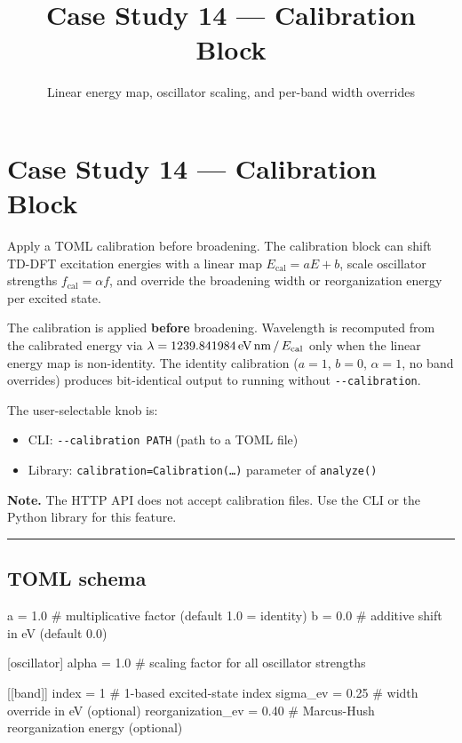 \documentclass[
  11pt,
]{article}
\title{Case Study 14 --- Calibration Block}
\subtitle{Linear energy map, oscillator scaling, and per-band width overrides}
\author{}
\date{}
\newenvironment{Shaded}{}{}
\providecommand{\tightlist}{
  \setlength{\itemsep}{0pt}\setlength{\parskip}{0pt}}
\begin{document}
\maketitle

{
\hypersetup{linkcolor=}
\setcounter{tocdepth}{2}
\tableofcontents
}
\hypertarget{case-study-14--calibration-block}{
\section{Case Study 14 --- Calibration
Block}\label{case-study-14--calibration-block}}

Apply a TOML calibration before broadening. The calibration block can
shift TD-DFT excitation energies with a linear map
\(E_{\text{cal}} = aE + b\), scale oscillator strengths
\(f_{\text{cal}} = \alpha f\), and override the broadening width or
reorganization energy per excited state.

The calibration is applied \textbf{before} broadening. Wavelength is
recomputed from the calibrated energy via
\(\lambda = 1239.841984\,\text{eV\,nm}\,/\,E_{\text{cal}}\) only when
the linear energy map is non-identity. The identity calibration
(\(a=1\), \(b=0\), \(\alpha=1\), no band overrides) produces
bit-identical output to running without \texttt{-{}-calibration}.

The user-selectable knob is:
\begin{itemize}
\tightlist
\item
  CLI: \texttt{-{}-calibration PATH} (path to a TOML file)
\item
  Library: \texttt{calibration=Calibration(\ldots)} parameter of
  \texttt{analyze()}
\end{itemize}

\textbf{Note.} The HTTP API does not accept calibration files. Use the
CLI or the Python library for this feature.

\begin{center}\rule{0.5\linewidth}{0.5pt}\end{center}

\hypertarget{toml-schema}{
\subsection{TOML schema}\label{toml-schema}}

\begin{Shaded}
\begin{Highlighting}[]
[energy]
a = 1.0    # multiplicative factor (default 1.0 = identity)
b = 0.0    # additive shift in eV (default 0.0)

[oscillator]
alpha = 1.0   # scaling factor for all oscillator strengths

[[band]]
index = 1           # 1-based excited-state index
sigma_ev = 0.25     # width override in eV (optional)
reorganization_ev = 0.40  # Marcus-Hush reorganization energy (optional)
\end{Highlighting}
\end{Shaded}
\end{document}
